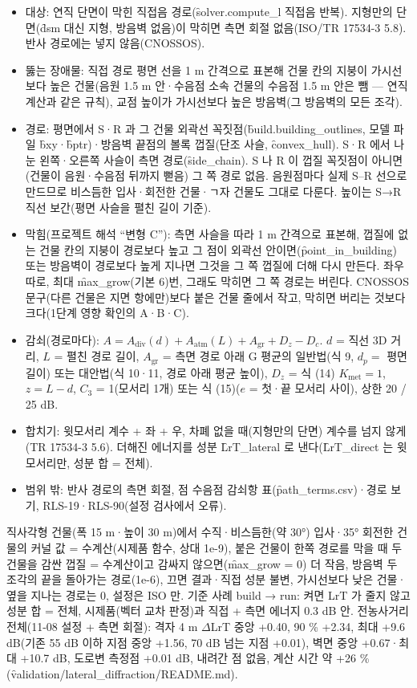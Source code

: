 \documentclass[10.5pt,a4paper]{article}
\begin{document}
\begin{itemize}
\item 대상: 연직 단면이 막힌 직접음 경로(\f{solver.compute\_l} 직접음 반복). 지형만의 단면(\f{dsm} 대신 지형, 방음벽 없음)이 막히면 측면 회절 없음(ISO/TR 17534-3 5.8). 반사 경로에는 넣지 않음(CNOSSOS).
\item 뚫는 장애물: 직접 경로 평면 선을 1 m 간격으로 표본해 건물 칸의 지붕이 가시선보다 높은 건물(음원 1.5 m 안·수음점 소속 건물의 수음점 1.5 m 안은 뺌 — 연직 계산과 같은 규칙), 교점 높이가 가시선보다 높은 방음벽(그 방음벽의 모든 조각).
\item 경로: 평면에서 S·R 과 그 건물 외곽선 꼭짓점(\f{build.building\_outlines}, 모델 파일 \f{bxy}·\f{bptr})·방음벽 끝점의 볼록 껍질(단조 사슬, \f{convex\_hull}). S·R 에서 나눈 왼쪽·오른쪽 사슬이 측면 경로(\f{side\_chain}). S 나 R 이 껍질 꼭짓점이 아니면(건물이 음원·수음점 뒤까지 뻗음) 그 쪽 경로 없음. 음원점마다 실제 S–R 선으로 만드므로 비스듬한 입사·회전한 건물·ㄱ자 건물도 그대로 다룬다. 높이는 S→R 직선 보간(평면 사슬을 펼친 길이 기준).
\item 막힘(프로젝트 해석 ``변형 C''): 측면 사슬을 따라 1 m 간격으로 표본해, 껍질에 없는 건물 칸의 지붕이 경로보다 높고 그 점이 외곽선 안이면(\f{point\_in\_building}) 또는 방음벽이 경로보다 높게 지나면 그것을 그 쪽 껍질에 더해 다시 만든다. 좌우 따로, 최대 \f{max\_grow}(기본 6)번, 그래도 막히면 그 쪽 경로는 버린다. CNOSSOS 문구(다른 건물은 지면 항에만)보다 붙은 건물 줄에서 작고, 막히면 버리는 것보다 크다(1단계 영향 확인의 A·B·C).
\item 감쇠(경로마다): $A = A_\mathrm{div}(d) + A_\mathrm{atm}(L) + A_\mathrm{gr} + D_z - D_c$. $d$ = 직선 3D 거리, $L$ = 펼친 경로 길이, $A_\mathrm{gr}$ = 측면 경로 아래 G 평균의 일반법(식 9, $d_p = $ 평면 길이) 또는 대안법(식 10·11, 경로 아래 평균 높이), $D_z$ = 식 (14) $K_\mathrm{met} = 1$, $z = L - d$, $C_3$ = 1(모서리 1개) 또는 식 (15)($e$ = 첫·끝 모서리 사이), 상한 20 / 25 dB.
\item 합치기: 윗모서리 계수 + 좌 + 우, 차폐 없을 때(지형만의 단면) 계수를 넘지 않게(TR 17534-3 5.6). 더해진 에너지를 성분 \f{LrT\_lateral} 로 낸다(\f{LrT\_direct} 는 윗모서리만, 성분 합 = 전체).
\item 범위 밖: 반사 경로의 측면 회절, 점 수음점 감쇠항 표(\f{path\_terms.csv})·경로 보기, RLS-19·RLS-90(설정 검사에서 오류).
\end{itemize}
 직사각형 건물(폭 15 m·높이 30 m)에서 수직·비스듬한(약 30°) 입사·35° 회전한 건물의 커널 값 = 수계산(시제품 함수, 상대 1e-9), 붙은 건물이 한쪽 경로를 막을 때 두 건물을 감싼 껍질 = 수계산이고 감싸지 않으면(\f{max\_grow} = 0) 더 작음, 방음벽 두 조각의 끝을 돌아가는 경로(1e-6), 끄면 결과·직접 성분 불변, 가시선보다 낮은 건물·옆을 지나는 경로는 0, 설정은 ISO 만. 기준 사례 build → run: 켜면 LrT 가 줄지 않고 성분 합 = 전체, 시제품(벡터 교차 판정)과 직접 + 측면 에너지 0.3 dB 안. 전농사거리 전체(11-08 설정 + 측면 회절): 격자 4 m $\Delta$LrT 중앙 +0.40, 90 \% +2.34, 최대 +9.6 dB(기존 55 dB 이하 지점 중앙 +1.56, 70 dB 넘는 지점 +0.01), 벽면 중앙 +0.67·최대 +10.7 dB, 도로변 측정점 +0.01 dB, 내려간 점 없음, 계산 시간 약 +26 \%(\f{validation/lateral\_diffraction/README.md}).
\end{document}
